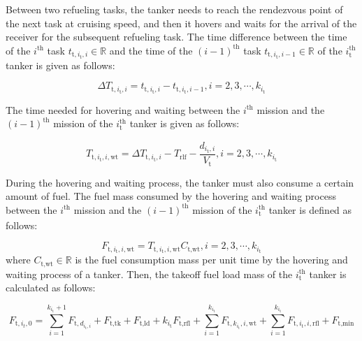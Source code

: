 Between two refueling tasks, the tanker needs to reach the rendezvous point of the next task at cruising speed, and then it hovers and waits for the arrival of the receiver for the subsequent refueling task. The time difference between the time of the $i_{}^{\text{th}}$  task $t_{\text{t},i_{\text{t}},i}\in\mathbb{R}$  and the time of the  $\left(i-1\right)^{\text{th}}$ task $t_{\text{t},i_{\text{t}},i-1}\in\mathbb{R}$ of the  $i_{\text{t}}^{\text{th}}$ tanker is given as follows:

\begin{equation}
\Delta T_{\text{t},i_{\text{t}},i}=t_{\text{t},i_{\text{t}},i}-t_{\text{t},i_{\text{t}},i-1},i=2,3,\cdots,k_{i_{\text{t}}}
\label{eq:15.26}
\end{equation}

The time needed for hovering and waiting between the $i_{}^{\text{th}}$  mission and the $(i-1)_{}^{\text{th}}$ mission of the $i_{\text{t}}^{\text{th}}$  tanker is given as follows:

\begin{equation}
T_{\text{t},i_{\text{t}},i,\text{wt}}=\Delta T_{\text{t},i_{\text{t}},i}-T_{\text{rlf}}-\frac{d_{i_{\text{t}},i}}{V_{\text{t}}},i=2,3,\cdots,k_{i_{\text{t}}}
\label{eq:15.27}
\end{equation}

During the hovering and waiting process, the tanker must also consume a certain amount of fuel. The fuel mass consumed by the hovering and waiting process between the $i_{}^{\text{th}}$  mission and the $(i-1)_{}^{\text{th}}$  mission of the  $i_{\text{t}}^{\text{th}}$ tanker is defined as follows: 

\begin{equation}
F_{\text{t},i_{\text{t}},i,\text{wt}}=T_{\text{t},i_{\text{t}},i,\text{wt}}C_{\text{t},\text{wt}},i=2,3,\cdots,k_{i_{\text{t}}}
\label{eq:15.28}
\end{equation}
where  $C_{\text{t,wt}}\in\mathbb{R}$ is the fuel consumption mass per unit time by the hovering and waiting process of a tanker. Then, the takeoff fuel load mass of the $i_{\text{t}}^{\text{th}}$ tanker is calculated as follows:

\begin{equation}
F_{\text{t},i_t,0}=\sum_{i=1}^{k_{i_\text{t}}+1}F_{\text{t},d_{i_\text{t},i}}+F_{\text{t},\text{t}\text{k}}+F_{\text{t},\text{l}\text{d}}+k_{i_\text{t}}F_{\text{t},\text{r}\text{f}\text{l}}+\sum_{i=1}^{k_{i_\text{t}}}F_{\text{t},k_{i_\text{t}},i,\text{w}\text{t}}+\sum_{i=1}^{k_{i_\text{t}}}F_{\text{t},i_\text{t},i,\text{r}\text{f}\text{l}}+F_{\text{t},\text{min}}
\label{eq:15.29}
\end{equation}

